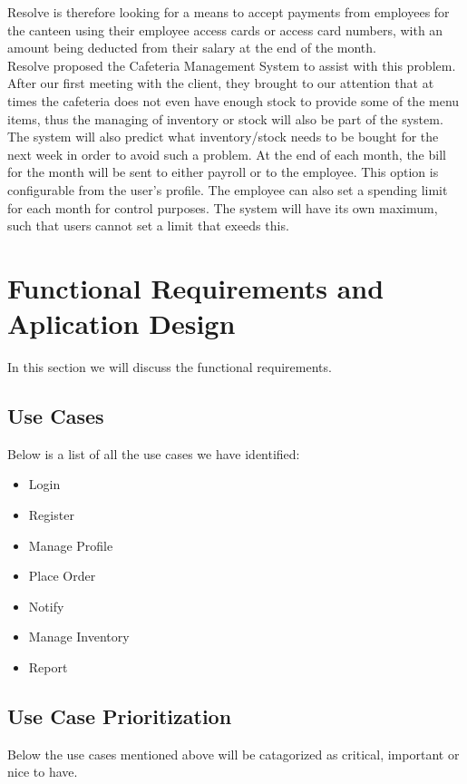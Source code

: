 \documentclass[12pt]{article}
\begin{document}
Resolve is therefore looking for a means to accept payments from employees for the canteen using their employee access cards or access card numbers, with an amount being deducted from their salary at the end of the month.\\

Resolve proposed the Cafeteria Management System to assist with this problem.
After our first meeting with the client, they brought to our attention that at times the cafeteria does not even have enough stock to provide some of the menu items, thus the managing of inventory or stock will also be part of the system. The system will also predict what inventory/stock needs to be bought for the next week in order to avoid such a problem. At the end of each month, the bill for the month will be sent to either payroll or to the employee. This option is configurable from the user's profile. The employee can also set a spending limit for each month for control purposes. The system will have its own maximum, such that users cannot set a limit that exeeds this. 
 
\section{Functional Requirements and Aplication Design}
In this section we will discuss the functional requirements. \\

\subsection{Use Cases }
Below is a list of all the use cases we have identified:

\begin{itemize}

\item  Login
\item Register
\item Manage Profile
\item Place Order
\item Notify
\item Manage Inventory
\item Report

\end{itemize}


\subsection{Use Case Prioritization}
Below the use cases mentioned above will be catagorized as critical, important or nice to have.
\end{document}
